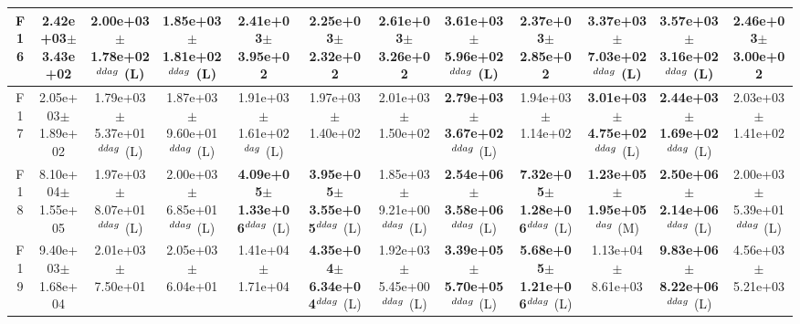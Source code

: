 \begin{table}[!t]
\begin{tabular}{c|ccccccccccc}
F16  & 2.42e+03$\pm$3.43e+02  & 2.00e+03$\pm$1.78e+02$^{\\ddag}$ (L)  & 1.85e+03$\pm$1.81e+02$^{\\ddag}$ (L)  & 2.41e+03$\pm$3.95e+02   & 2.25e+03$\pm$2.32e+02   & 2.61e+03$\pm$3.26e+02   & \textbf{3.61e+03$\pm$5.96e+02}$^{\\ddag}$ (L)  & 2.37e+03$\pm$2.85e+02   & \textbf{3.37e+03$\pm$7.03e+02}$^{\\ddag}$ (L)  & \textbf{3.57e+03$\pm$3.16e+02}$^{\\ddag}$ (L)  & 2.46e+03$\pm$3.00e+02  \\ \hline
F17  & 2.05e+03$\pm$1.89e+02  & 1.79e+03$\pm$5.37e+01$^{\\ddag}$ (L)  & 1.87e+03$\pm$9.60e+01$^{\\ddag}$ (L)  & 1.91e+03$\pm$1.61e+02$^{\\dag}$ (L)  & 1.97e+03$\pm$1.40e+02   & 2.01e+03$\pm$1.50e+02   & \textbf{2.79e+03$\pm$3.67e+02}$^{\\ddag}$ (L)  & 1.94e+03$\pm$1.14e+02   & \textbf{3.01e+03$\pm$4.75e+02}$^{\\ddag}$ (L)  & \textbf{2.44e+03$\pm$1.69e+02}$^{\\ddag}$ (L)  & 2.03e+03$\pm$1.41e+02  \\ \hline
F18  & 8.10e+04$\pm$1.55e+05  & 1.97e+03$\pm$8.07e+01$^{\\ddag}$ (L)  & 2.00e+03$\pm$6.85e+01$^{\\ddag}$ (L)  & \textbf{4.09e+05$\pm$1.33e+06}$^{\\ddag}$ (L)  & \textbf{3.95e+05$\pm$3.55e+05}$^{\\ddag}$ (L)  & 1.85e+03$\pm$9.21e+00$^{\\ddag}$ (L)  & \textbf{2.54e+06$\pm$3.58e+06}$^{\\ddag}$ (L)  & \textbf{7.32e+05$\pm$1.28e+06}$^{\\ddag}$ (L)  & \textbf{1.23e+05$\pm$1.95e+05}$^{\\dag}$ (M)  & \textbf{2.50e+06$\pm$2.14e+06}$^{\\ddag}$ (L)  & 2.00e+03$\pm$5.39e+01$^{\\ddag}$ (L) \\ \hline
F19  & 9.40e+03$\pm$1.68e+04  & 2.01e+03$\pm$7.50e+01   & 2.05e+03$\pm$6.04e+01   & 1.41e+04$\pm$1.71e+04   & \textbf{4.35e+04$\pm$6.34e+04}$^{\\ddag}$ (L)  & 1.92e+03$\pm$5.45e+00$^{\\ddag}$ (L)  & \textbf{3.39e+05$\pm$5.70e+05}$^{\\ddag}$ (L)  & \textbf{5.68e+05$\pm$1.21e+06}$^{\\ddag}$ (L)  & 1.13e+04$\pm$8.61e+03   & \textbf{9.83e+06$\pm$8.22e+06}$^{\\ddag}$ (L)  & 4.56e+03$\pm$5.21e+03  \\ \hline

\end{tabular}
\end{table}

